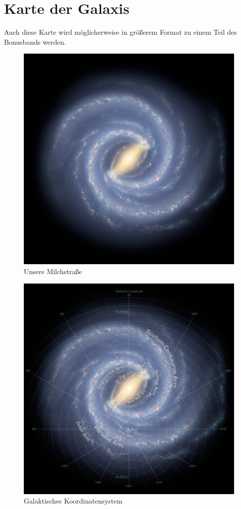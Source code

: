 \chapter{Karte der Galaxis}

Auch diese Karte wird möglicherweise in größerem Format zu einem Teil des Bonusbands werden.

\begin{figure}[p]
    \includegraphics[width=\linewidth]{z-include-main-squaremap1.jpg}
    \caption{Unsere Milchstraße}
\end{figure}

\begin{figure}[p]
    \includegraphics[width=\linewidth]{z-include-main-squaremap2.jpg}
    \caption{Galaktisches Koordinatensystem}
\end{figure}


